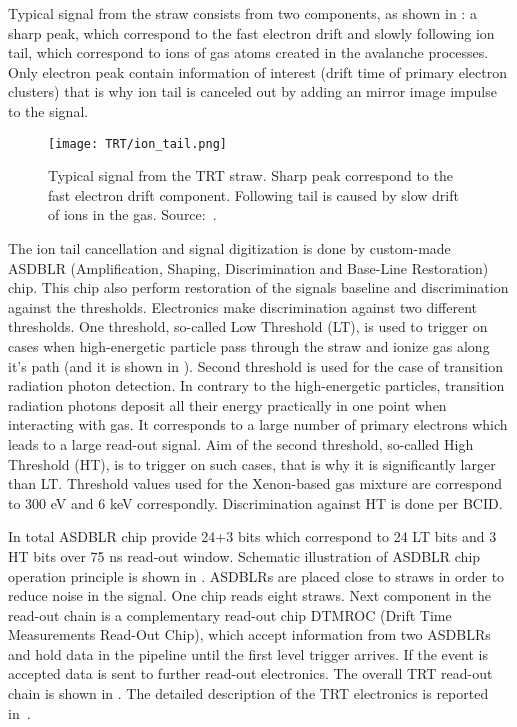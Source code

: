 Typical signal from the straw consists from two components, as shown in : 
a sharp peak, which correspond to the fast electron drift and slowly following ion tail, which correspond to ions of gas atoms created in the avalanche processes. 
Only electron peak contain information of interest (drift time of primary electron clusters) that is why ion tail is canceled out by adding an mirror image impulse to the signal.

\begin{figure}
\centering
\texttt{[image: TRT/ion\_tail.png]}
\caption{ 
 Typical signal from the TRT straw. Sharp peak correspond to the fast electron drift component.
 Following tail is caused by slow drift of ions in the gas.
 Source:~\cite{ID_TDR_vol2}.
}
\label{fig:ion_tail}
\end{figure}

The ion tail cancellation and signal digitization is done by custom-made ASDBLR (Amplification, Shaping, Discrimination and Base-Line Restoration) chip. 
This chip also perform restoration of the signals baseline and discrimination against the thresholds. 
Electronics make discrimination against two different thresholds. One threshold, so-called Low Threshold (LT), 
is used to trigger on cases when high-energetic particle pass through the straw and ionize gas along it's path (and it is shown in ).
Second threshold is used for the case of transition radiation photon detection.
In contrary to the high-energetic particles, transition radiation photons deposit all their energy practically in one point when interacting with gas.
It corresponds to a large number of primary electrons which leads to a large read-out signal.
Aim of the second threshold, so-called High Threshold (HT), is to trigger on such cases, that is why it is significantly larger than LT.
Threshold values used for the Xenon-based gas mixture are correspond to 300 eV and 6 keV correspondly.
Discrimination against HT is done per BCID. 


In total ASDBLR chip provide 24+3 bits which correspond to 24 LT bits and 3 HT bits over 75 ns read-out window.
Schematic illustration of ASDBLR chip operation principle is shown in .
ASDBLRs are placed close to straws in order to reduce noise in the signal. One chip reads eight straws.
Next component in the read-out chain is a complementary read-out chip DTMROC (Drift Time Measurements Read-Out Chip), which accept 
information from two ASDBLRs and hold data in the pipeline until the first level trigger arrives. If the event is accepted data is sent to further read-out electronics.
The overall TRT read-out chain is shown in . The detailed description of the TRT electronics is reported in~\cite{TRT_electronics}.

